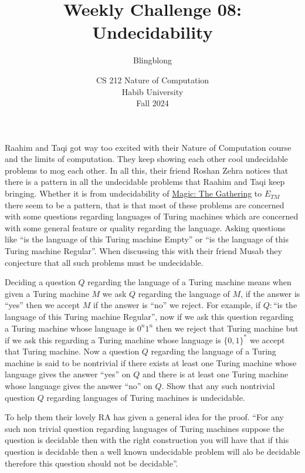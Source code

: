 \documentclass[a4paper]{exam}
\title{Weekly Challenge 08: Undecidability}
\author{Blingblong} %
\date{CS 212 Nature of Computation\\Habib University\\Fall 2024}
\begin{document}
\maketitle

\begin{questions}
  
    Raahim and Taqi got way too excited with their Nature of Computation course and the limits of computation. They keep showing each other cool undecidable problems to mog each other.
    In all this, their friend Roshan Zehra notices that there is a pattern in all the undecidable problems that Raahim and Taqi keep bringing. Whether it is from undecidability of \href{https://arxiv.org/abs/1904.09828}{Magic: The Gathering} to $E_{TM}$ there seem to be a pattern, that is that most of these problems are concerned with some questions regarding languages of Turing machines which are concerned with some general feature or quality regarding the language. Asking questions like ``is the language of this Turing machine Empty'' or ``is the language of this Turing machine Regular''. When discussing this with their friend Musab they conjecture that all such problems must be undecidable.

    Deciding a question $Q$ regarding the language of a Turing machine means when given a Turing machine $M$ we ask $Q$ regarding the language of $M$, if the answer is ``yes'' then we accept $M$ if the answer is ``no'' we reject. For example, if $Q:$``is the language of this Turing machine Regular'', now if we ask this question regarding a Turing machine whose language is $0^n1^n$ then we reject that Turing machine but if we ask this regarding a Turing machine whose language is $\{0,1\}^*$ we accept that Turing machine.
    Now a question $Q$ regarding the language of a Turing machine is said to be nontrivial if there exists at least one Turing machine whose language gives the answer ``yes'' on $Q$ and there is at least one Turing machine whose language gives the answer ``no'' on $Q$. Show that any such nontrivial question $Q$ regarding languages of Turing machines is undecidable. 
   
    To help them their lovely RA has given a general idea for the proof. ``For any such non trivial question regarding languages of Turing machines suppose the question is decidable then with the right construction you will have that if this question is decidable then a well known undecidable problem will alo be decidable therefore this question should not be decidable''. 
  \begin{solution}
  \end{solution}
\end{questions}
\end{document}
